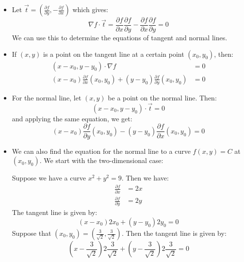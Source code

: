 \begin{itemize}
\begin{theorem}
\begin{proof}
        \end{proof}
    \end{theorem}
    \item Let $\vec{t} = \left(\frac{\partial f}{\partial y}, -\frac{\partial f}{\partial x}\right)$ which gives:
    \begin{equation}
        \nabla f \cdot \vec{t} = \frac{\partial f}{\partial x} \frac{\partial f}{\partial y} - \frac{\partial f}{\partial x}\frac{\partial f}{\partial y} = 0
    \end{equation}
    We can use this to determine the equations of tangent and normal lines.
    \item If $(x,y)$ is a point on the tangent line at a certain point $(x_0,y_0)$, then:
    \begin{align}
        (x-x_0, y-y_0) \cdot \nabla f &= 0 \\ 
        (x-x_0)\frac{\partial f}{\partial x}(x_0,y_0) + (y-y_0)\frac{\partial f}{\partial y}(x_0, y_0) &= 0
    \end{align}
    \item For the normal line, let $(x,y)$ be a point on the normal line. Then:
    \begin{equation}
        (x-x_0, y-y_0)\cdot \vec{t} = 0
    \end{equation}
    and applying the same equation, we get:
    \begin{equation}
        (x-x_0)\frac{\partial f}{\partial y} (x_0,y_0) - (y-y_0)\frac{\partial f}{\partial x}(x_0,y_0)=0
    \end{equation}
    \item We can also find the equation for the normal line to a curve $f(x,y)=C$ at $(x_0,y_0)$. We start with the two-dimensional case:
    \begin{example}
        Suppose we have a curve $x^2+y^2=9$. Then we have:
        \begin{align}
            \frac{\partial f}{\partial x} &= 2x \\ 
            \frac{\partial f}{\partial y} &= 2y
        \end{align}
        The tangent line is given by:
        \begin{equation}
            (x-x_0)2x_0 + (y-y_0)2y_0 = 0
        \end{equation}
        Suppose that $(x_0,y_0)=\left(\frac{3}{\sqrt{2}}, \frac{3}{\sqrt{2}}\right)$. Then the tangent line is given by:
        \begin{equation}
            \left(x-\frac{3}{\sqrt{2}}\right)2\frac{3}{\sqrt{2}}+\left(y-\frac{3}{\sqrt{2}}\right)2\frac{3}{\sqrt{2}} = 0

\end{equation}
\end{example}
\end{itemize}
